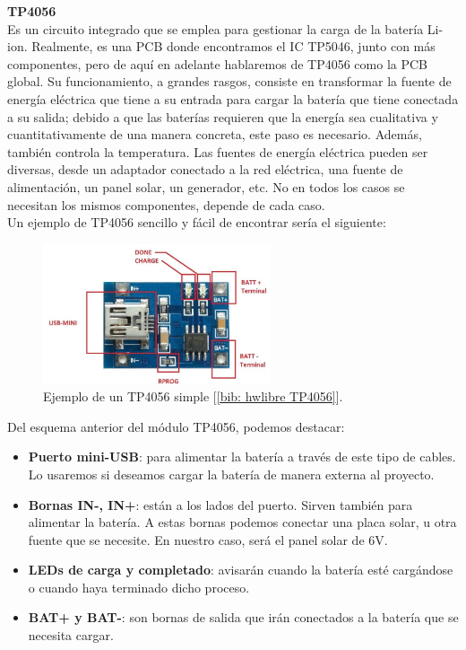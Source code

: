 \documentclass[12pt]{article}
\begin{document}
	\noindent \textbf{TP4056} \\

	\noindent Es un circuito integrado que se emplea para gestionar la carga de la batería Li-ion.  Realmente, es una PCB donde encontramos el IC TP5046, junto con más componentes, pero de aquí en adelante hablaremos de TP4056 como la PCB global. Su funcionamiento, a grandes rasgos, consiste en transformar la fuente de energía eléctrica que tiene a su entrada para cargar la batería que tiene conectada a su salida; debido a que las baterías requieren que la energía sea cualitativa y cuantitativamente de una manera concreta, este paso es necesario. Además, también controla la temperatura. Las fuentes de energía eléctrica pueden ser diversas, desde un adaptador conectado a la red eléctrica, una fuente de alimentación, un panel solar, un generador, etc. No en todos los casos se necesitan los mismos componentes, depende de cada caso.\\
	
	\noindent Un ejemplo de TP4056 sencillo y fácil de encontrar sería el siguiente:  

	\begin{figure}[h]
		\begin{center}
			\includegraphics[width=0.6\textwidth]{img/tp4056_withoutBoost.png}
			\caption{Ejemplo de un TP4056 simple [\ref{bib: hwlibre TP4056}].}
			\label{TP4056 sin boost}
		\end{center}
	\end{figure}
	
	\noindent Del esquema anterior del módulo TP4056, podemos destacar: 
	
	\begin{itemize}
		\item \textbf{Puerto mini-USB}: para alimentar la batería a través de este tipo de cables. Lo usaremos si deseamos cargar la batería de manera externa al proyecto.
		\item \textbf{Bornas IN-, IN+}: están a los lados del puerto. Sirven también para alimentar la batería. A estas bornas podemos conectar una placa solar, u otra fuente que se necesite. En nuestro caso, será el panel solar de 6V.
		\item \textbf{LEDs de carga y completado}: avisarán cuando la batería esté cargándose o cuando haya terminado dicho proceso.
		\item \textbf{BAT+ y BAT-}: son bornas de salida que irán conectados a la batería que se necesita cargar.
	\end{itemize}
\end{document}
